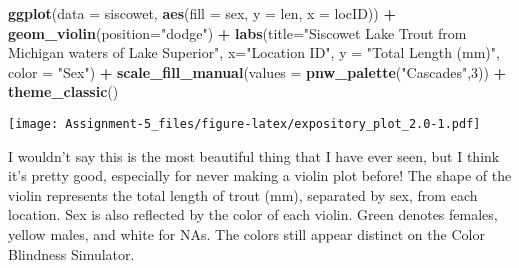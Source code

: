 \documentclass[
]{article}
\newenvironment{Shaded}{\begin{snugshade}}{\end{snugshade}}
\newcommand{\DataTypeTok}[1]{\textcolor[rgb]{0.13,0.29,0.53}{#1}}
\newcommand{\DecValTok}[1]{\textcolor[rgb]{0.00,0.00,0.81}{#1}}
\newcommand{\KeywordTok}[1]{\textcolor[rgb]{0.13,0.29,0.53}{\textbf{#1}}}
\newcommand{\NormalTok}[1]{#1}
\newcommand{\OperatorTok}[1]{\textcolor[rgb]{0.81,0.36,0.00}{\textbf{#1}}}
\newcommand{\StringTok}[1]{\textcolor[rgb]{0.31,0.60,0.02}{#1}}
\begin{document}
\begin{Shaded}
\begin{Highlighting}[]
\KeywordTok{ggplot}\NormalTok{(}\DataTypeTok{data =}\NormalTok{ siscowet, }
       \KeywordTok{aes}\NormalTok{(}\DataTypeTok{fill =}\NormalTok{ sex, }\DataTypeTok{y =}\NormalTok{ len, }\DataTypeTok{x =}\NormalTok{ locID)) }\OperatorTok{+}\StringTok{ }
\StringTok{  }\KeywordTok{geom_violin}\NormalTok{(}\DataTypeTok{position=}\StringTok{"dodge"}\NormalTok{) }\OperatorTok{+}
\StringTok{  }\KeywordTok{labs}\NormalTok{(}\DataTypeTok{title=}\StringTok{"Siscowet Lake Trout from Michigan waters of Lake Superior"}\NormalTok{,}
       \DataTypeTok{x=}\StringTok{"Location ID"}\NormalTok{, }
       \DataTypeTok{y =} \StringTok{"Total Length (mm)"}\NormalTok{,}
       \DataTypeTok{color =} \StringTok{"Sex"}\NormalTok{) }\OperatorTok{+}\StringTok{ }
\StringTok{  }\KeywordTok{scale_fill_manual}\NormalTok{(}\DataTypeTok{values =} \KeywordTok{pnw_palette}\NormalTok{(}\StringTok{"Cascades"}\NormalTok{,}\DecValTok{3}\NormalTok{)) }\OperatorTok{+}
\StringTok{  }\KeywordTok{theme_classic}\NormalTok{()}
\end{Highlighting}
\end{Shaded}

\texttt{[image: Assignment-5\_files/figure-latex/expository\_plot\_2.0-1.pdf]}

I wouldn't say this is the most beautiful thing that I have ever seen,
but I think it's pretty good, especially for never making a violin plot
before! The shape of the violin represents the total length of trout
(mm), separated by sex, from each location. Sex is also reflected by the
color of each violin. Green denotes females, yellow males, and white for
NAs. The colors still appear distinct on the Color Blindness Simulator.
\end{document}
